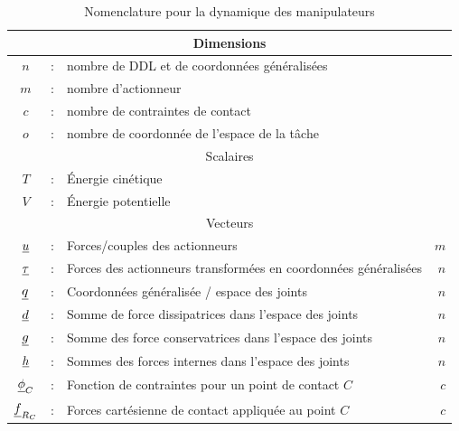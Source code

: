 \begin{table}[H]
	\centering
	\caption{Nomenclature pour la dynamique des manipulateurs}	%
		\begin{tabular}{ c c l r }
        \hline \hline
				\multicolumn{4}{c}{Dimensions} \\
				\hline \hline
			$n$             &  :  & nombre de DDL et de coordonnées généralisées                                         & \\
			$m$             &  :  & nombre d'actionneur                                       & \\
			$c$             &  :  & nombre de contraintes de contact                             & \\
			$o$             &  :  & nombre de coordonnée de l'espace de la tâche                        & \\ 
            \hline \hline
			\multicolumn{4}{c}{Scalaires} \\
			\hline \hline
            $T$    &  :  & Énergie cinétique           &   \\
            $V$    &  :  & Énergie potentielle         &   \\
			\hline \hline
			\multicolumn{4}{c}{Vecteurs} \\
			\hline \hline
			$\underline{u}$    &  :  & Forces/couples des actionneurs                                   & $m$  \\
            $\underline{\tau}$    &  :  & Forces des actionneurs transformées en coordonnées généralisées                              & $n$  \\
			$\underline{q}$       &  :  & Coordonnées généralisée / espace des joints    & $n$  \\
			$\underline{d}$       &  :  & Somme de force dissipatrices dans l'espace des joints                             & $n$  \\
			$\underline{g}$       &  :  & Somme des force conservatrices dans l'espace des joints                             & $n$  \\
			$\underline{h}$       &  :  & Sommes des forces internes dans l'espace des joints               & $n$  \\
			$\underline{\phi}_C$    &  :  & Fonction de contraintes pour un point de contact $C$                                          & $c$  \\
			$\underline{f}_{R_C}$     &  :  & Forces cartésienne de contact appliquée au point $C$                                  & $c$  \\

\end{tabular}
\end{table}
